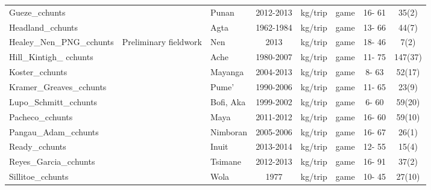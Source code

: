 \begin{landscape}
\begin{longtable}{M{2.6cm} M{3.6cm} M{1.5cm} c c M{1cm} c c}
Gueze\_cchunts                 & \cite{reyes-garcia_adaptive_2016}         & Punan           & 2012-2013  & kg/trip   & game               & 16- 61  & 35(2)      \\%
Headland\_cchunts              & \cite{headland_why_1986}                  & Agta            & 1962-1984  & kg/trip   & game               & 13- 66  & 44(7)     \\%
Healey\_Nen\_PNG\_cchunts        & Preliminary fieldwork                     & Nen             & 2013       & kg/trip   & game               & 18- 46  & 7(2)        \\
Hill\_Kintigh\_ cchunts          & \cite{hill_can_2009}                      & Ache            & 1980-2007  & kg/trip   & game               & 11- 75  & 147(37)  \\%
Koster\_cchunts                & \cite{koster_hunting_2008}                & Mayanga         & 2004-2013  & kg/trip   & game               & 8- 63   & 52(17)     \\%
Kramer\_Greaves\_cchunts        & \cite{kramer_why_2017}                    & Pume'           & 1990-2006  & kg/trip   & game               & 11- 65  & 23(9)     \\%
Lupo\_Schmitt\_cchunts          & \cite{lupo_upper_2002}                    & Bofi, Aka       & 1999-2002  & kg/trip   & game               & 6- 60   & 59(20)    \\%
Pacheco\_cchunts               & \cite{pacheco-cobos_economic_2015}        & Maya            & 2011-2012  & kg/trip   & game               & 16- 60  & 59(10)     \\%
Pangau\_Adam\_cchunts           & \cite{pangau-adam_wildmeat_2012}          & Nimboran        & 2005-2006  & kg/trip   & game               & 16- 67  & 26(1)      \\%
Ready\_cchunts                 & \cite{ready_food_2016}                    & Inuit           & 2013-2014  & kg/trip   & game               & 12- 55  & 15(4)       \\%
Reyes\_Garcia\_cchunts          & \cite{reyes-garcia_adaptive_2016}         & Tsimane         & 2012-2013  & kg/trip   & game               & 16- 91  & 37(2)      \\%
Sillitoe\_cchunts              & \cite{sillitoe_managing_2004}             & Wola            & 1977       & kg/trip   & game               & 10- 45  & 27(10)    \\%

\end{longtable}
\end{landscape}
